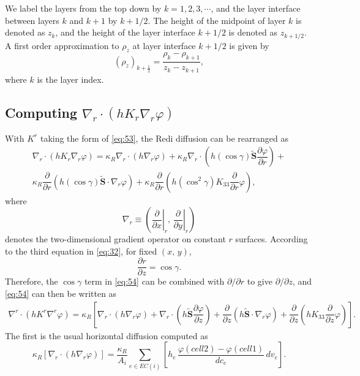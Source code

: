 \documentclass[12pt]{report}
\def\p{\partial}
\def\tilde{\widetilde}
\begin{document}
We label the layers from the top down by $k=1,2,3,\cdots$, and the 
layer interface between layers $k$ and $k+1$ by $k+1/2$. The height
of the midpoint of layer $k$ is denoted as $z_k$, and the height of 
the layer interface $k+1/2$ is denoted as $z_{k+1/2}$. 
A first order 
approximation to $\rho_z$ at layer interface $k+1/2$ is given by 
\begin{equation}
  \left(\rho_z\right)_{k+\frac{1}{2}} = 
  \dfrac{\rho_k - \rho_{k+1}}{z_k - z_{k+1}},\label{eq:21}
\end{equation}
where $k$ is the layer index.



\subsection{Computing $\nabla_r\cdot(hK_r\nabla_r\varphi)$}

With $K^r$ taking the form of \eqref{eq:53}, the Redi
diffusion can be rearranged as
\begin{multline}
\label{eq:54}
  \nabla_r\cdot(hK_r\nabla_r\varphi) = \kappa_R  \nabla_r\cdot(h\nabla_r\varphi)
  + \kappa_R \nabla_r\cdot\left(h (\cos\gamma) \tilde{\mathbf{S}}\dfrac{\p\varphi}{\p
      r}\right) +\\ \kappa_R \dfrac{\p}{\p
    r}\left(h (\cos\gamma) \tilde{\mathbf{S}}\cdot\nabla_r\varphi\right) +
   \kappa_R \dfrac{\p}{\p r}\left(h (\cos^2\gamma) K_{33}\dfrac{\p}{\p
      r}\varphi\right) , 
\end{multline}
where 
$$\nabla_r \equiv \left(\left.\frac{\p}{\p x}\right|_r,\, \left.\frac{\p}{\p
    y}\right|_r\right)$$
denotes the two-dimensional gradient operator on
constant $r$ surfaces. According to the third equation in
\eqref{eq:32}, for fixed $(x,\,y)$, 
\begin{displaymath}
  \dfrac{\p r}{\p z} = \cos\gamma.
\end{displaymath}
Therefore, the $\cos\gamma$ term in \eqref{eq:54} can be combined with
$\p/\p r$ to give $\p/\p z$, and \eqref{eq:54} can then be written as
\begin{multline}
\label{eq:55}
  \nabla^r\cdot( h K^r\nabla^r\varphi) = \kappa_R \left[ \nabla_r\cdot(h \nabla_r\varphi)
  + \nabla_r\cdot\left(h \tilde{\mathbf{S}}\dfrac{\p\varphi}{\p
      z}\right) + \dfrac{\p}{\p
    z}\left(h \tilde{\mathbf{S}}\cdot\nabla_r\varphi\right) +
  \dfrac{\p}{\p z}\left(h  K_{33}\dfrac{\p}{\p
      z}\varphi\right) \right].
\end{multline}
The first is the usual horizontal diffusion computed as
\begin{equation}
\kappa_R  \left[ \nabla_r \cdot (h \nabla_r\varphi) \right] =  \frac{\kappa_R}{A_i}\sum_{e\in EC(i)} \left[  h_e \, \frac{\varphi(cell2)-\varphi(cell1)}{dc_e}  \, dv_e \right].
\end{equation}
\end{document}
